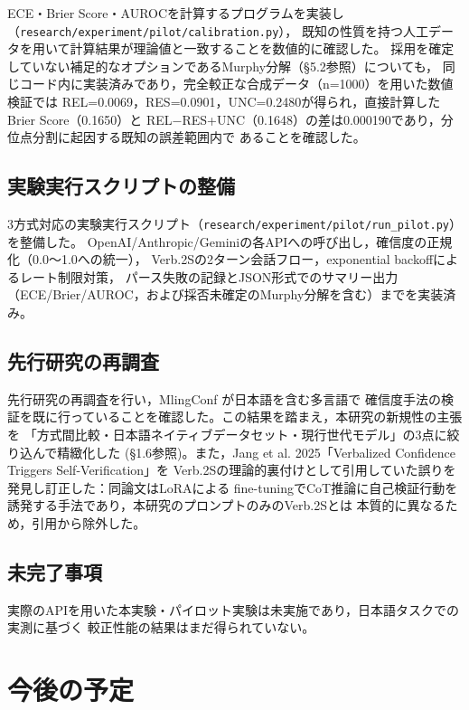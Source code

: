 \documentclass[11pt,a4paper,oneside]{article}
\begin{document}
ECE・Brier Score・AUROCを計算するプログラムを実装し（\texttt{research/experiment/pilot/calibration.py}），
既知の性質を持つ人工データを用いて計算結果が理論値と一致することを数値的に確認した。
採用を確定していない補足的なオプションであるMurphy分解（\S5.2参照）についても，
同じコード内に実装済みであり，完全較正な合成データ（n=1000）を用いた数値検証では
REL=0.0069，RES=0.0901，UNC=0.2480が得られ，直接計算したBrier Score（0.1650）と
REL−RES+UNC（0.1648）の差は0.000190であり，分位点分割に起因する既知の誤差範囲内で
あることを確認した。

\subsection{実験実行スクリプトの整備}

3方式対応の実験実行スクリプト（\texttt{research/experiment/pilot/run\_pilot.py}）を整備した。
OpenAI/Anthropic/Geminiの各APIへの呼び出し，確信度の正規化（0.0〜1.0への統一），
Verb.2Sの2ターン会話フロー，exponential backoffによるレート制限対策，
パース失敗の記録とJSON形式でのサマリー出力（ECE/Brier/AUROC，および採否未確定のMurphy分解を含む）までを実装済み。

\subsection{先行研究の再調査}

先行研究の再調査を行い，MlingConf \cite{xue2025mlingconf} が日本語を含む多言語で
確信度手法の検証を既に行っていることを確認した。この結果を踏まえ，本研究の新規性の主張を
「方式間比較・日本語ネイティブデータセット・現行世代モデル」の3点に絞り込んで精緻化した
(\S1.6参照)。また，Jang et al. 2025「Verbalized Confidence Triggers Self-Verification」を
Verb.2Sの理論的裏付けとして引用していた誤りを発見し訂正した：同論文はLoRAによる
fine-tuningでCoT推論に自己検証行動を誘発する手法であり，本研究のプロンプトのみのVerb.2Sとは
本質的に異なるため，引用から除外した。

\subsection{未完了事項}

実際のAPIを用いた本実験・パイロット実験は未実施であり，日本語タスクでの実測に基づく
較正性能の結果はまだ得られていない。

\section{今後の予定}
\end{document}

